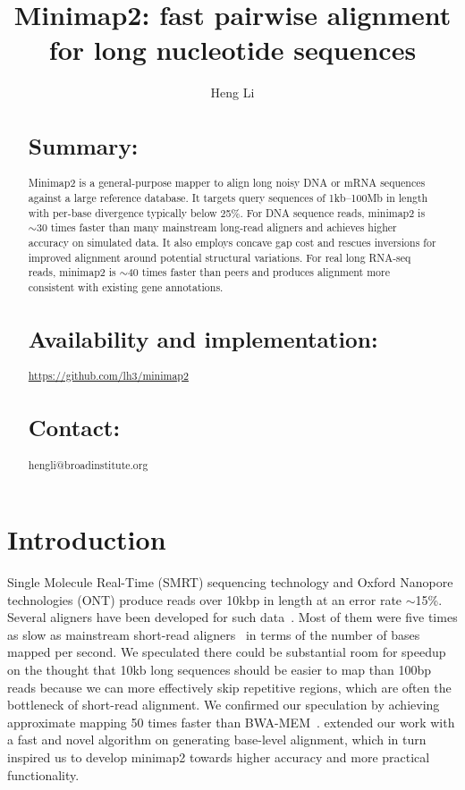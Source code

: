 \documentclass{bioinfo}
\begin{document}

\title[Aligning long nucleotide sequences with minimap2]{Minimap2: fast pairwise alignment for long nucleotide sequences}
\author[Li]{Heng Li}
\address{Broad Institute, 415 Main Street, Cambridge, MA 02142, USA}

\maketitle

\begin{abstract}
\section{Summary:} Minimap2 is a general-purpose mapper to align long noisy DNA
or mRNA sequences against a large reference database. It targets query
sequences of 1kb--100Mb in length with per-base divergence typically below
25\%. For DNA sequence reads, minimap2 is $\sim$30 times faster than many
mainstream long-read aligners and achieves higher accuracy on simulated data.
It also employs concave gap cost and rescues inversions for improved alignment
around potential structural variations. For real long RNA-seq reads, minimap2
is $\sim$40 times faster than peers and produces alignment more consistent with
existing gene annotations.

\section{Availability and implementation:}
\href{https://github.com/lh3/minimap2}{https://github.com/lh3/minimap2}

\section{Contact:} hengli@broadinstitute.org
\end{abstract}

\section{Introduction}

Single Molecule Real-Time (SMRT) sequencing technology and Oxford Nanopore
technologies (ONT) produce reads over 10kbp in length at an error rate
$\sim$15\%. Several aligners have been developed for such
data~\citep{Chaisson:2012aa,Li:2013aa,Liu:2016ab,Sovic:2016aa,Liu:2017aa,Lin:2017aa,Sedlazeck169557}.
Most of them were five times as slow as mainstream short-read
aligners~\citep{Langmead:2012fk,Li:2013aa} in terms of the number of bases
mapped per second. We speculated there could be substantial room for speedup on
the thought that 10kb long sequences should be easier to map than 100bp reads
because we can more effectively skip repetitive regions, which are often the
bottleneck of short-read alignment. We confirmed our speculation by achieving
approximate mapping 50 times faster than BWA-MEM~\citep{Li:2016aa}.
\citet{Suzuki:2016} extended our work with a fast and novel algorithm on
generating base-level alignment, which in turn inspired us to develop minimap2
towards higher accuracy and more practical functionality.
\end{document}
